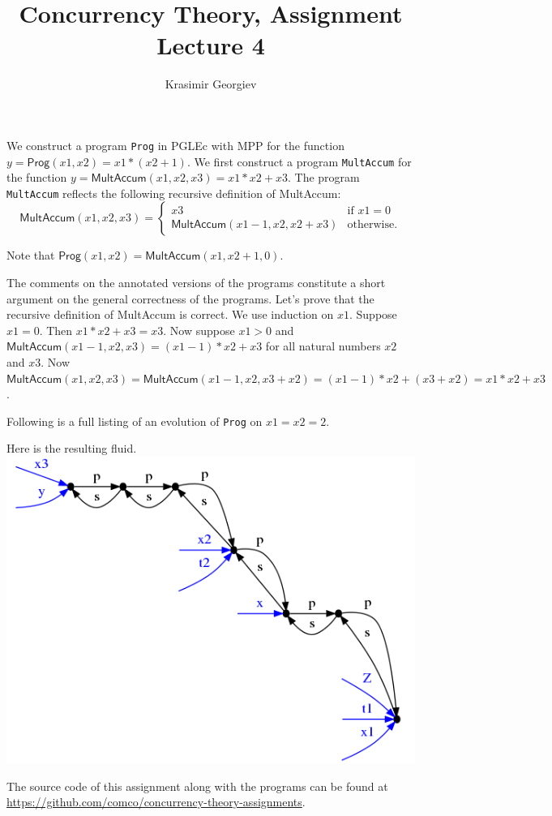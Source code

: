 \documentclass[a4paper]{article}
\title{Concurrency Theory, Assignment Lecture 4}
\author{Krasimir Georgiev}
\newcommand{\prog}[1]{\texttt{#1}}
\newcommand{\pfun}[1]{\textsf{#1}}
\begin{document}
\maketitle

We construct a program \prog{Prog} in PGLEc with MPP for the function
$y = \pfun{Prog}(x1, x2) = x1 * (x2 + 1)$.
We first construct a program \prog{MultAccum} for the function $y =
\pfun{MultAccum}(x1, x2, x3) = x1 * x2 + x3$.
The program \prog{MultAccum} reflects the following recursive definition of
\pfun{MultAccum}:
\[
\pfun{MultAccum}(x1, x2, x3) =
\begin{cases}
    x3 & \mbox{if } x1 = 0 \\
    \pfun{MultAccum}(x1 - 1, x2, x2 + x3) & \mbox{otherwise.}
\end{cases}
\]


\newpage
Note that $\pfun{Prog}(x1, x2) = \pfun{MultAccum}(x1, x2 + 1, 0)$.

The comments on the annotated versions of the programs constitute a short
argument on the general correctness of the programs. Let's prove that the
recursive definition of \pfun{MultAccum} is correct. We use induction on $x1$.
Suppose $x1 = 0$. Then $x1*x2 + x3 = x3$.
Now suppose $x1 > 0$ and $\pfun{MultAccum}(x1 - 1, x2, x3) = (x1 - 1)*x2 + x3$
for all natural numbers $x2$ and $x3$.
Now $\pfun{MultAccum}(x1, x2, x3) = \pfun{MultAccum}(x1 - 1, x2, x3 + x2) =
(x1 - 1)*x2 + (x3 + x2) = x1*x2 + x3$.

Following is a full listing of an evolution of \prog{Prog} on $x1=x2=2$.


Here is the resulting fluid.
\includegraphics[scale=0.5]{fluid_2_2.png}

The source code of this assignment along with the programs can be found at
\url{https://github.com/comco/concurrency-theory-assignments}.
\end{document}
